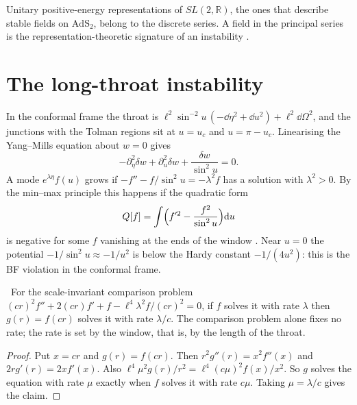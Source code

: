 Unitary positive-energy representations of $SL(2,\mathbb R)$, the ones that describe stable fields on $\mathrm{AdS}_2$, belong to the discrete series. A field in the principal series is the representation-theoretic signature of an instability \cite{BreitenlohnerFreedman1982}.

\section{The long-throat instability}

In the conformal frame the throat is $\ell^2\sin^{-2}u\,(-\dd\eta^2+\dd u^2)+\ell^2\dd\Omega^2$, and the junctions with the Tolman regions sit at $u=u_c$ and $u=\pi-u_c$. Linearising the Yang--Mills equation about $w=0$ gives
\[
-\partial_\eta^2\delta w+\partial_u^2\delta w+\frac{\delta w}{\sin^2u}=0 .
\]
A mode $e^{\lambda\eta}f(u)$ grows if $-f''-f/\sin^2u=-\lambda^2f$ has a solution with $\lambda^2>0$. By the min--max principle this happens if the quadratic form
\[
Q[f]=\int\Bigl(f'^2-\frac{f^2}{\sin^2u}\Bigr)\mathrm{d} u
\]
is negative for some $f$ vanishing at the ends of the window \ext. Near $u=0$ the potential $-1/\sin^2u\approx-1/u^2$ is below the Hardy constant $-1/(4u^2)$: this is the BF violation in the conformal frame.

\begin{proposition}\label{prop:scale}\ver\
For the scale-invariant comparison problem $(cr)^2f''+2(cr)f'+f-\ell^4\lambda^2f/(cr)^2=0$, if $f$ solves it with rate $\lambda$ then $g(r)=f(cr)$ solves it with rate $\lambda/c$. The comparison problem alone fixes no rate; the rate is set by the window, that is, by the length of the throat.
\end{proposition}
\begin{proof}
Put $x=cr$ and $g(r)=f(cr)$. Then $r^2g''(r)=x^2f''(x)$ and $2rg'(r)=2xf'(x)$. Also $\ell^4\mu^2g(r)/r^2=\ell^4(c\mu)^2f(x)/x^2$. So $g$ solves the equation with rate $\mu$ exactly when $f$ solves it with rate $c\mu$. Taking $\mu=\lambda/c$ gives the claim.
\end{proof}


